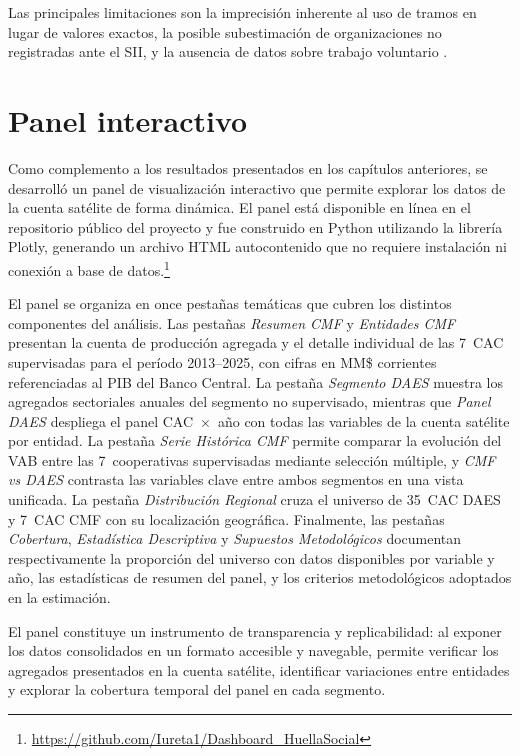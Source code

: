 Las principales limitaciones son la imprecisión inherente
al uso de tramos en lugar de valores exactos, la posible
subestimación de organizaciones no registradas ante el SII,
y la ausencia de datos sobre trabajo voluntario
\cite{vereinte_nationen_satellite_2018}.


\section{Panel interactivo}
\label{sec:panel}


Como complemento a los resultados presentados en los
capítulos anteriores, se desarrolló un panel de visualización
interactivo que permite explorar los datos de la cuenta
satélite de forma dinámica. El panel está disponible en línea
en el repositorio público del proyecto y fue construido en
Python utilizando la librería Plotly, generando un archivo
HTML autocontenido que no requiere instalación ni conexión
a base de datos.\footnote{\url{https://github.com/Iureta1/Dashboard_HuellaSocial}}

El panel se organiza en once pestañas temáticas que cubren
los distintos componentes del análisis. Las pestañas
\textit{Resumen CMF} y \textit{Entidades CMF} presentan la
cuenta de producción agregada y el detalle individual de las
7~CAC supervisadas para el período 2013--2025, con cifras en
MM\$ corrientes referenciadas al PIB del Banco Central. La
pestaña \textit{Segmento DAES} muestra los agregados
sectoriales anuales del segmento no supervisado, mientras
que \textit{Panel DAES} despliega el panel CAC~$\times$~año
con todas las variables de la cuenta satélite por entidad.
La pestaña \textit{Serie Histórica CMF} permite comparar la
evolución del VAB entre las 7~cooperativas supervisadas
mediante selección múltiple, y \textit{CMF vs DAES} contrasta
las variables clave entre ambos segmentos en una vista
unificada. La pestaña \textit{Distribución Regional} cruza
el universo de 35~CAC DAES y 7~CAC CMF con su localización
geográfica. Finalmente, las pestañas \textit{Cobertura},
\textit{Estadística Descriptiva} y \textit{Supuestos
Metodológicos} documentan respectivamente la proporción del
universo con datos disponibles por variable y año, las
estadísticas de resumen del panel, y los criterios
metodológicos adoptados en la estimación.

El panel constituye un instrumento de transparencia y
replicabilidad: al exponer los datos consolidados en un
formato accesible y navegable, permite verificar los
agregados presentados en la cuenta satélite, identificar
variaciones entre entidades y explorar la cobertura temporal
del panel en cada segmento.

